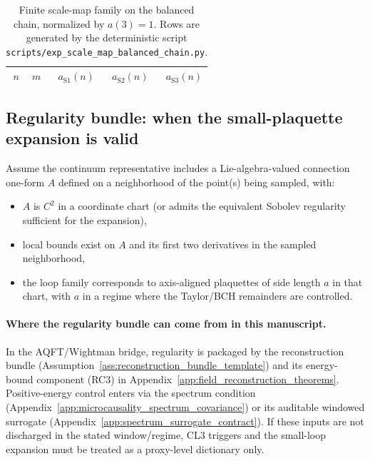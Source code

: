 \begin{table}[H]
\centering
\scriptsize
\setlength{\tabcolsep}{10pt}
\renewcommand{\arraystretch}{1.15}
\begin{tabular}{rrrrr}
\toprule
$n$ & $m$ & $a_{\mathrm{S1}}(n)$ & $a_{\mathrm{S2}}(n)$ & $a_{\mathrm{S3}}(n)$ \\
\midrule
%
\end{tabular}
\caption{Finite scale-map family on the balanced chain, normalized by $a(3)=1$. Rows are generated by the deterministic script \texttt{scripts/exp\_scale\_map\_balanced\_chain.py}.}
\label{tab:scale_map_balanced_chain_family}
\end{table}

\subsection{Regularity bundle: when the small-plaquette expansion is valid}
\begin{assumption}
\label{ass:small_loop_regularity_bundle}
\MathTag Assume the continuum representative includes a Lie-algebra-valued connection one-form $A$ defined on a neighborhood of the point(s) being sampled, with:
\begin{itemize}
\item $A$ is $C^2$ in a coordinate chart (or admits the equivalent Sobolev regularity sufficient for the expansion),
\item local bounds exist on $A$ and its first two derivatives in the sampled neighborhood,
\item the loop family corresponds to axis-aligned plaquettes of side length $a$ in that chart, with $a$ in a regime where the Taylor/BCH remainders are controlled.
\end{itemize}
\end{assumption}

\paragraph{Where the regularity bundle can come from in this manuscript.}
\AuditTag In the AQFT/Wightman bridge, regularity is packaged by the reconstruction bundle (Assumption~\ref{ass:reconstruction_bundle_template}) and its energy-bound component (RC3) in Appendix~\ref{app:field_reconstruction_theorems}.
Positive-energy control enters via the spectrum condition (Appendix~\ref{app:microcausality_spectrum_covariance}) or its auditable windowed surrogate (Appendix~\ref{app:spectrum_surrogate_contract}).
If these inputs are not discharged in the stated window/regime, CL3 triggers and the small-loop expansion must be treated as a proxy-level dictionary only.

